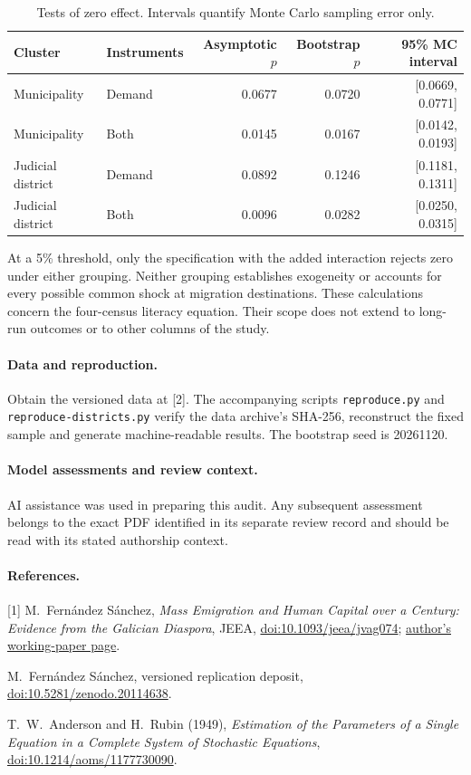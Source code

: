 \documentclass[10pt]{article}
\begin{document}
\begin{table}[h]\centering
\caption{Tests of zero effect. Intervals quantify Monte Carlo sampling error only.}
\begin{tabular}{llrrr}\toprule
Cluster & Instruments & Asymptotic $p$ & Bootstrap $p$ & 95\% MC interval\\\midrule
Municipality & Demand & 0.0677 & 0.0720 & [0.0669, 0.0771]\\
Municipality & Both & 0.0145 & 0.0167 & [0.0142, 0.0193]\\
Judicial district & Demand & 0.0892 & 0.1246 & [0.1181, 0.1311]\\
Judicial district & Both & 0.0096 & 0.0282 & [0.0250, 0.0315]\\\bottomrule
\end{tabular}
\end{table}

At a 5\% threshold, only the specification with the added interaction rejects zero under either grouping. Neither grouping establishes exogeneity or accounts for every possible common shock at migration destinations. These calculations concern the four-census literacy equation. Their scope does not extend to long-run outcomes or to other columns of the study.

\paragraph{Data and reproduction.} Obtain the versioned data at [2]. The accompanying scripts \texttt{reproduce.py} and \texttt{reproduce-districts.py} verify the data archive's SHA-256, reconstruct the fixed sample and generate machine-readable results. The bootstrap seed is 20261120.
\paragraph{Model assessments and review context.} AI assistance was used in preparing this audit. Any subsequent assessment belongs to the exact PDF identified in its separate review record and should be read with its stated authorship context.
\paragraph{References.}
[1] M.~Fern\'andez S\'anchez, \emph{Mass Emigration and Human Capital over a Century: Evidence from the Galician Diaspora}, JEEA, \href{https://doi.org/10.1093/jeea/jvag074}{doi:10.1093/jeea/jvag074}; \href{https://sites.google.com/view/martinfernandezsanchez/research}{author's working-paper page}.\par
[2] M.~Fern\'andez S\'anchez, versioned replication deposit, \href{https://doi.org/10.5281/zenodo.20114638}{doi:10.5281/zenodo.20114638}.\par
[3] T.~W.~Anderson and H.~Rubin (1949), \emph{Estimation of the Parameters of a Single Equation in a Complete System of Stochastic Equations}, \href{https://doi.org/10.1214/aoms/1177730090}{doi:10.1214/aoms/1177730090}.
\end{document}
